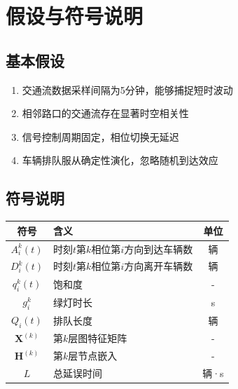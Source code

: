 \newpage
\section{假设与符号说明}

\subsection{基本假设}
\begin{enumerate}
    \item 交通流数据采样间隔为5分钟，能够捕捉短时波动
    \item 相邻路口的交通流存在显著时空相关性
    \item 信号控制周期固定，相位切换无延迟
    \item 车辆排队服从确定性演化，忽略随机到达效应
\end{enumerate}

\subsection{符号说明}
\begin{center}
\begin{tabular}{c l c}
\hline
符号 & 含义 & 单位 \\
\hline
$A_i^k(t)$ & 时刻$t$第$k$相位第$i$方向到达车辆数 & 辆 \\
$D_i^k(t)$ & 时刻$t$第$k$相位第$i$方向离开车辆数 & 辆 \\
$q_i^k(t)$ & 饱和度 & - \\
$g_i^k$ & 绿灯时长 & s \\
$Q_i(t)$ & 排队长度 & 辆 \\
$\mathbf{X}^{(k)}$ & 第$k$层图特征矩阵 & - \\
$\mathbf{H}^{(k)}$ & 第$k$层节点嵌入 & - \\
$L$ & 总延误时间 & 辆·s \\
\hline
\end{tabular}
\end{center}
